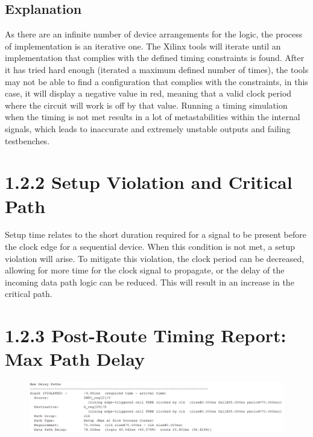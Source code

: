 \documentclass[11pt]{report}
\begin{document}
\subsection*{Explanation}
As there are an infinite number of device arrangements for the logic, the process of implementation is an iterative one. The Xilinx tools will iterate until an implementation that complies with the defined timing constraints is found. After it has tried hard enough (iterated a maximum defined number of times), the tools may not be able to find a configuration that complies with the constraints, in this case, it will display a negative value in red, meaning that a valid clock period where the circuit will work is off by that value. Running a timing simulation when the timing is not met results in a lot of metastabilities within the internal signals, which leads to inaccurate and extremely unstable outputs and failing testbenches.

\section*{1.2.2 Setup Violation and Critical Path}
Setup time relates to the short duration required for a signal to be present before the clock edge for a sequential device. When this condition is not met, a setup violation will arise. To mitigate this violation, the clock period can be decreased, allowing for more time for the clock signal to propagate, or the delay of the incoming data path logic can be reduced. This will result in an increase in the critical path.

\section*{1.2.3 Post-Route Timing Report: Max Path Delay}
\begin{figure}[H]
    \includegraphics[width=\columnwidth]{Reports/Lab2/Waveforms/1.2.3_max-path-delay.png}
\end{figure}
\end{document}
